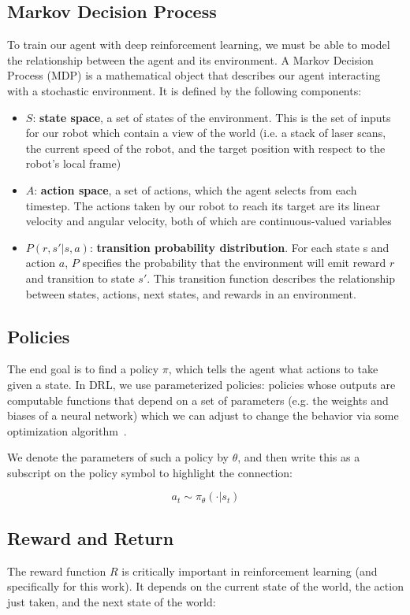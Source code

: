 \subsection{Markov Decision Process}
To train our agent with deep reinforcement learning, we must be able to model the relationship between the agent and its environment. A Markov Decision Process (MDP) is a mathematical object that describes our agent interacting with a stochastic environment. It is defined by the following components:
\begin{itemize}
\item $S$: \textbf{state space}, a set of states of the environment. This is the set of inputs for our robot which contain a view of the world (i.e. a stack of laser scans, the current speed of the robot, and the target position with respect to the robot's local frame)
\item $A$: \textbf{action space}, a set of actions, which the agent selects from each timestep. The actions taken by our robot to reach its target are its linear velocity and angular velocity, both of which are continuous-valued variables
\item $P(r, s' | s, a)$: \textbf{transition probability distribution}. For each state s and action $a$, $P$ specifies the probability that the environment will emit reward $r$ and transition to state $s'$. This transition function describes the relationship between states, actions, next states, and rewards in an environment.
\end{itemize}

\subsection{Policies}
The end goal is to find a policy $\pi$, which tells the agent what actions to take given a state. In DRL, we use parameterized policies: policies whose outputs are computable functions that depend on a set of parameters (e.g. the weights and biases of a neural network) which we can adjust to change the behavior via some optimization algorithm~\cite{SpinningUp2018}.

We denote the parameters of such a policy by $\theta$, and then write this as a subscript on the policy symbol to highlight the connection:

\begin{equation}
a_{t} \sim \pi_{\theta}(\cdot | s_{t})
\end{equation}

\subsection{Reward and Return}
The reward function $R$ is critically important in reinforcement learning (and specifically for this work). It depends on the current state of the world, the action just taken, and the next state of the world:

